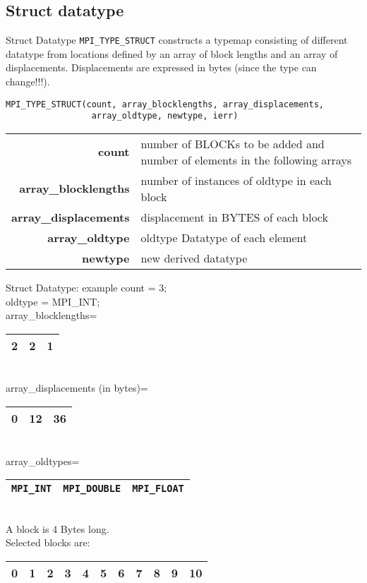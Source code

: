 \documentclass[aspectratio=43]{beamer}
\begin{document}
\subsection{Struct datatype}
\begin{frame}[fragile]{Struct Datatype}
\verb+MPI_TYPE_STRUCT+ constructs a typemap consisting of different datatype from locations defined by an array of block lengths and an array of displacements.
Displacements are expressed in bytes (since the type can change!!!).
\footnotesize
\begin{verbatim}
MPI_TYPE_STRUCT(count, array_blocklengths, array_displacements,
                 array_oldtype, newtype, ierr)
\end{verbatim}
\vspace{-0.2cm}
\begin{black1block}{}
\begin{tabular}{rp{6.5cm}}
\textbf{count} & number of BLOCKs to be added and number of elements in the following arrays\\
\textbf{array\_blocklengths} & number of instances of oldtype in each block\\
\textbf{array\_displacements} & displacement in BYTES of each block\\
\textbf{array\_oldtype} & oldtype Datatype of each element\\
\textbf{newtype} & new derived datatype\\
\end{tabular}
\end{black1block}
\end{frame}

\begin{frame}[fragile]{Struct Datatype: example}
count = 3;\\
oldtype = MPI\_INT;\\
array\_blocklengths=
\begin{tabular}{|c|c|c|}
\hline
2  & 2  & 1 \\
\hline
\end{tabular}\\
array\_displacements (in bytes)=
\begin{tabular}{|c|c|c|}
\hline
0  & 12  & 36 \\
\hline
\end{tabular}\\
array\_oldtypes=
\begin{tabular}{|c|c|c|}
\hline
\verb+MPI_INT+  & \verb+MPI_DOUBLE+  & \verb+MPI_FLOAT+ \\
\hline
\end{tabular}\\[0.5cm]

A block is 4 Bytes long.\\
Selected blocks are:
\begin{tabular}{|c|c|c|c|c|c|c|c|c|c|c|}
\hline
\color{cscsred}0  & \color{cscsred}1  & 2 & \color{cscsred}3 & \color{cscsred}4 & \color{cscsred}5 & \color{cscsred}6 & 7 & 8 & \color{cscsred}9 & 10\\
\hline
\end{tabular}\\


\end{frame}
\end{document}
